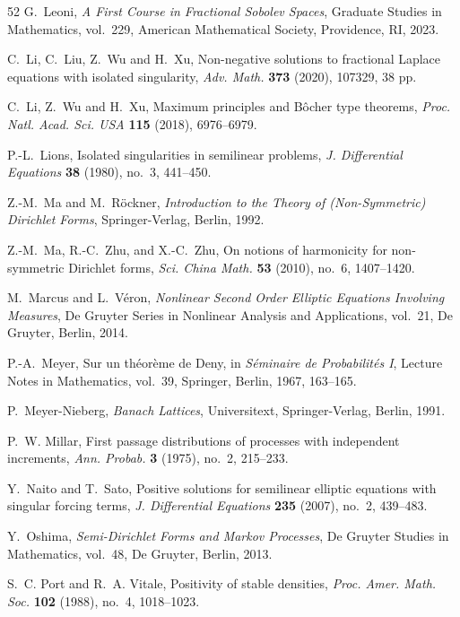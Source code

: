 \documentclass[11pt,a4paper,reqno]{amsart}
\theoremstyle{definition}
\numberwithin{equation}{section}
\begin{document}
\begin{thebibliography}{52}
G.~Leoni,
\emph{A First Course in Fractional Sobolev Spaces},
Graduate Studies in Mathematics, vol.~229,
American Mathematical Society, Providence, RI, 2023.

 C.~Li, C.~Liu, Z.~Wu and H.~Xu, Non-negative solutions to fractional Laplace equations with isolated singularity, 
\emph{Adv. Math.} \textbf{373} (2020), 107329, 38 pp. 

 C.~Li, Z.~Wu and H.~Xu, Maximum principles and B\^ocher type theorems, \emph{Proc. Natl. Acad. Sci. USA} \textbf{115} (2018), 6976--6979.


P.-L.~Lions,
Isolated singularities in semilinear problems,
\emph{J. Differential Equations} \textbf{38} (1980), no.~3, 441--450.

Z.-M.~Ma and M.~R\"ockner,
\emph{Introduction to the Theory of (Non-Symmetric) Dirichlet Forms},
Springer-Verlag, Berlin, 1992.

Z.-M.~Ma, R.-C.~Zhu, and X.-C.~Zhu,
On notions of harmonicity for non-symmetric Dirichlet forms,
\emph{Sci. China Math.} \textbf{53} (2010), no.~6, 1407--1420.

M.~Marcus and L.~V\'eron,
\emph{Nonlinear Second Order Elliptic Equations Involving Measures},
De Gruyter Series in Nonlinear Analysis and Applications, vol.~21,
De Gruyter, Berlin, 2014.

P.-A.~Meyer,
Sur un th\'eor\`eme de Deny,
in \emph{S\'eminaire de Probabilit\'es I},
Lecture Notes in Mathematics, vol.~39,
Springer, Berlin, 1967, 163--165.

P.~Meyer-Nieberg,
\emph{Banach Lattices},
Universitext,
Springer-Verlag, Berlin, 1991.

P.~W. Millar,
First passage distributions of processes with independent increments,
\emph{Ann. Probab.} \textbf{3} (1975), no.~2, 215--233.

Y.~Naito and T.~Sato,
Positive solutions for semilinear elliptic equations with singular forcing terms,
\emph{J. Differential Equations} \textbf{235} (2007), no.~2, 439--483.

Y.~Oshima,
\emph{Semi-Dirichlet Forms and Markov Processes},
De Gruyter Studies in Mathematics, vol.~48,
De Gruyter, Berlin, 2013.

S.~C. Port and R.~A. Vitale,
Positivity of stable densities,
\emph{Proc. Amer. Math. Soc.} \textbf{102} (1988), no.~4, 1018--1023.


\end{thebibliography}
\end{document}
